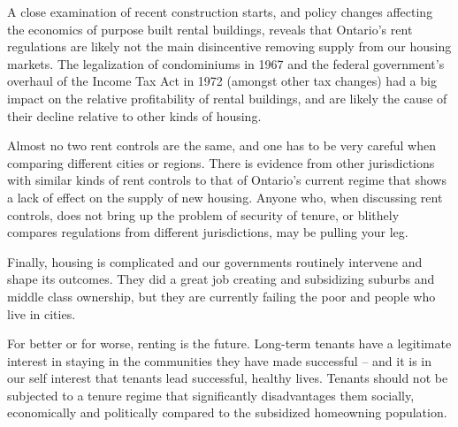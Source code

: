 A close examination of recent construction starts, and policy changes affecting the economics of purpose built rental buildings, reveals that Ontario's rent regulations are likely not the main disincentive removing supply from our housing markets. The legalization of condominiums in 1967 and the federal government's overhaul of the Income Tax Act in 1972 (amongst other tax changes) had a big impact on the relative profitability of rental buildings, and are likely the cause of their decline relative to other kinds of housing.

Almost no two rent controls are the same, and one has to be very careful when comparing different cities or regions. There is evidence from other jurisdictions with similar kinds of rent controls to that of Ontario's current regime that shows a lack of effect on the supply of new housing. Anyone who, when discussing rent controls, does not bring up the problem of security of tenure, or blithely compares regulations from different jurisdictions, may be pulling your leg.


Finally, housing is complicated and our governments routinely intervene and shape its outcomes. They did a great job creating and subsidizing suburbs and middle class ownership, but they are currently failing the poor and people who live in cities. 

For better or for worse, renting is the future. Long-term tenants have a legitimate interest in staying in the communities they have made successful -- and it is in our self interest that tenants lead successful, healthy lives. Tenants should not be subjected to a tenure regime that significantly disadvantages them socially, economically and politically compared to the subsidized homeowning population.

